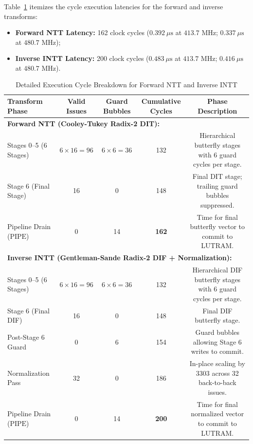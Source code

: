 Table~\ref{tab:ntt_cycle_breakdown} itemizes the cycle execution latencies for the forward and inverse transforms:
\begin{itemize}
    \item \textbf{Forward NTT Latency:} 162 clock cycles ($0.392\ \mu\text{s}$ at $413.7\text{ MHz}$; $0.337\ \mu\text{s}$ at $480.7\text{ MHz}$);
    \item \textbf{Inverse INTT Latency:} 200 clock cycles ($0.483\ \mu\text{s}$ at $413.7\text{ MHz}$; $0.416\ \mu\text{s}$ at $480.7\text{ MHz}$).
\end{itemize}

\begin{table}[!t]
\caption{Detailed Execution Cycle Breakdown for Forward NTT and Inverse INTT}
\label{tab:ntt_cycle_breakdown}
\centering
\footnotesize
\begin{tabular*}{\textwidth}{@{\extracolsep{\fill}} lcccc @{}}
\toprule
\textbf{Transform Phase} & \textbf{Valid Issues} & \textbf{Guard Bubbles} & \textbf{Cumulative Cycles} & \textbf{Phase Description} \\
\midrule
\multicolumn{5}{l}{\textbf{Forward NTT (Cooley-Tukey Radix-2 DIT):}} \\
Stages 0--5 (6 Stages) & $6 \times 16 = 96$ & $6 \times 6 = 36$ & 132 & Hierarchical butterfly stages with 6 guard cycles per stage. \\
Stage 6 (Final Stage)  & 16 & 0 & 148 & Final DIT stage; trailing guard bubbles suppressed. \\
Pipeline Drain ($\text{PIPE}$) & 0 & 14 & \textbf{162} & Time for final butterfly vector to commit to LUTRAM. \\
\midrule
\multicolumn{5}{l}{\textbf{Inverse INTT (Gentleman-Sande Radix-2 DIF + Normalization):}} \\
Stages 0--5 (6 Stages) & $6 \times 16 = 96$ & $6 \times 6 = 36$ & 132 & Hierarchical DIF butterfly stages with 6 guard cycles per stage. \\
Stage 6 (Final DIF)    & 16 & 0 & 148 & Final DIF butterfly stage. \\
Post-Stage 6 Guard     & 0 & 6 & 154 & Guard bubbles allowing Stage 6 writes to commit. \\
Normalization Pass     & 32 & 0 & 186 & In-place scaling by $3303$ across 32 back-to-back issues. \\
Pipeline Drain ($\text{PIPE}$) & 0 & 14 & \textbf{200} & Time for final normalized vector to commit to LUTRAM. \\
\bottomrule
\end{tabular*}
\end{table}

